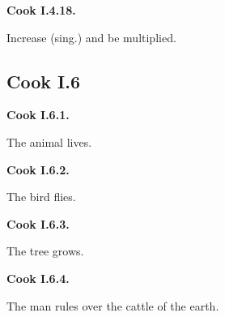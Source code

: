 \par\begin{minipage}{\linewidth}\raggedright
\textbf{Cook I.4.18.}

Increase (sing.) and be multiplied.

\end{minipage}\par\addvspace{4pt}

\subsection*{Cook I.6}

\par\begin{minipage}{\linewidth}\raggedright
\textbf{Cook I.6.1.}

The animal lives.

\end{minipage}\par\addvspace{4pt}

\par\begin{minipage}{\linewidth}\raggedright
\textbf{Cook I.6.2.}

The bird flies.

\end{minipage}\par\addvspace{4pt}

\par\begin{minipage}{\linewidth}\raggedright
\textbf{Cook I.6.3.}

The tree grows.

\end{minipage}\par\addvspace{4pt}

\par\begin{minipage}{\linewidth}\raggedright
\textbf{Cook I.6.4.}

The man rules over the cattle of the earth.

\end{minipage}\par\addvspace{4pt}

